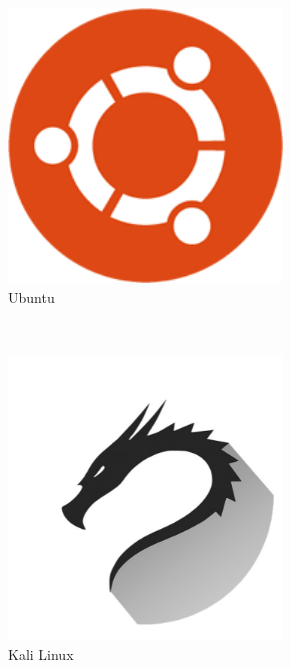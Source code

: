 \documentclass{article}
\begin{document}
\begin{figure}[h]
	\centering
	\begin{subfigure}{0.4\textwidth}
		\includegraphics[width=0.8\textwidth]{ubuntulogo.png}
		\caption{Ubuntu}
	\end{subfigure}
	~
	\begin{subfigure}{0.4\textwidth}
		\includegraphics[width=0.8\textwidth]{kalilogo.png}
		\caption{Kali Linux}
	\end{subfigure}
	~
	\begin{subfigure}{0.4\textwidth}

\end{subfigure}
\end{figure}
\end{document}
